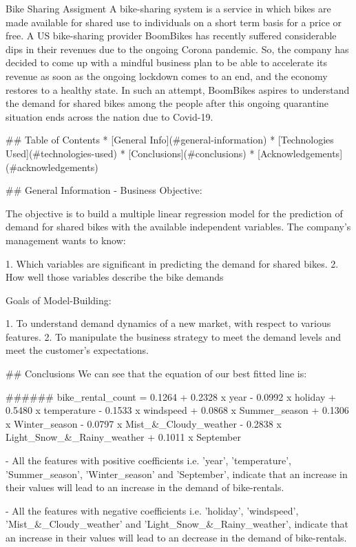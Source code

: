 Bike Sharing Assigment
A bike-sharing system is a service in which bikes are made available for shared use to individuals on a short term basis for a price or free. A US bike-sharing provider BoomBikes has recently suffered considerable dips in their revenues due to the ongoing Corona pandemic. So, the company has decided to come up with a mindful business plan to be able to accelerate its revenue as soon as the ongoing lockdown comes to an end, and the economy restores to a healthy state. In such an attempt, BoomBikes aspires to understand the demand for shared bikes among the people after this ongoing quarantine situation ends across the nation due to Covid-19.


## Table of Contents
* [General Info](#general-information)
* [Technologies Used](#technologies-used)
* [Conclusions](#conclusions)
* [Acknowledgements](#acknowledgements)


## General Information
- Business Objective:

The objective is to build a multiple linear regression model for the prediction of demand for shared bikes with the available independent variables. The company's management wants to know:

1. Which variables are significant in predicting the demand for shared bikes.
2. How well those variables describe the bike demands

Goals of Model-Building:

1. To understand demand dynamics of a new market, with respect to various features.
2. To manipulate the business strategy to meet the demand levels and meet the customer's expectations.



## Conclusions
We can see that the equation of our best fitted line is:

###### bike_rental_count = 0.1264 + 0.2328 x year - 0.0992 x holiday + 0.5480 x temperature - 0.1533 x windspeed + 0.0868 x Summer_season + 0.1306 x Winter_season - 0.0797 x Mist_&_Cloudy_weather - 0.2838 x Light_Snow_&_Rainy_weather + 0.1011 x September



- All the features with positive coefficients i.e. 'year', 'temperature', 'Summer_season', 'Winter_season' and 'September', indicate that an increase in their values will lead to an increase in the demand of bike-rentals.

- All the features with negative coefficients i.e. 'holiday', 'windspeed', 'Mist_&_Cloudy_weather' and 'Light_Snow_&_Rainy_weather', indicate that an increase in their values will lead to an decrease in the demand of bike-rentals.

